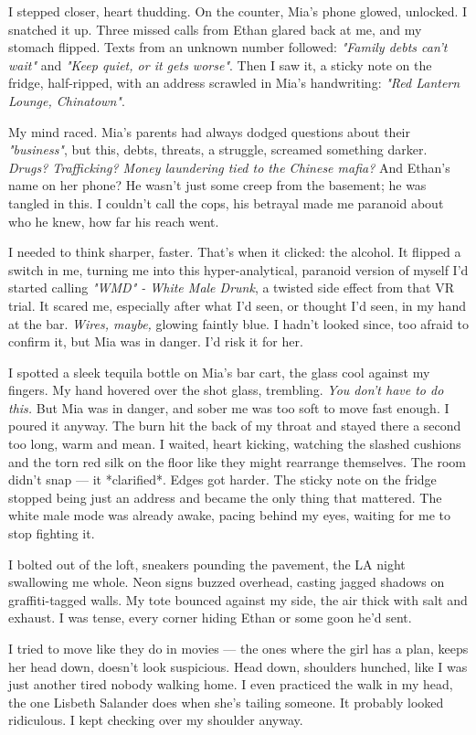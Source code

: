 \documentclass[12pt,oneside]{book}
\begin{document}
I stepped closer, heart thudding. On the counter, Mia’s phone glowed, unlocked. I snatched it up. Three missed calls from Ethan glared back at me, and my stomach flipped. Texts from an unknown number followed: \textit{"Family debts can’t wait"} and \textit{"Keep quiet, or it gets worse"}. Then I saw it, a sticky note on the fridge, half-ripped, with an address scrawled in Mia’s handwriting: \textit{"Red Lantern Lounge, Chinatown"}.

My mind raced. Mia’s parents had always dodged questions about their \textit{"business"}, but this, debts, threats, a struggle, screamed something darker. \textit{Drugs? Trafficking? Money laundering tied to the Chinese mafia?} And Ethan’s name on her phone? He wasn’t just some creep from the basement; he was tangled in this. I couldn’t call the cops, his betrayal made me paranoid about who he knew, how far his reach went.

I needed to think sharper, faster. That’s when it clicked: the alcohol. It flipped a switch in me, turning me into this hyper-analytical, paranoid version of myself I’d started calling \textit{"WMD" - White Male Drunk}, a twisted side effect from that VR trial. It scared me, especially after what I’d seen, or thought I’d seen, in my hand at the bar. \textit{Wires, maybe,} glowing faintly blue. I hadn’t looked since, too afraid to confirm it, but Mia was in danger. I’d risk it for her.

I spotted a sleek tequila bottle on Mia’s bar cart, the glass cool against my fingers. My hand hovered over the shot glass, trembling. \textit{You don’t have to do this.} But Mia was in danger, and sober me was too soft to move fast enough. I poured it anyway. The burn hit the back of my throat and stayed there a second too long, warm and mean. I waited, heart kicking, watching the slashed cushions and the torn red silk on the floor like they might rearrange themselves. The room didn’t snap — it *clarified*. Edges got harder. The sticky note on the fridge stopped being just an address and became the only thing that mattered. The white male mode was already awake, pacing behind my eyes, waiting for me to stop fighting it.

I bolted out of the loft, sneakers pounding the pavement, the LA night swallowing me whole. Neon signs buzzed overhead, casting jagged shadows on graffiti-tagged walls. My tote bounced against my side, the air thick with salt and exhaust. I was tense, every corner hiding Ethan or some goon he’d sent.

I tried to move like they do in movies — the ones where the girl has a plan, keeps her head down, doesn’t look suspicious. Head down, shoulders hunched, like I was just another tired nobody walking home. I even practiced the walk in my head, the one Lisbeth Salander does when she’s tailing someone. It probably looked ridiculous. I kept checking over my shoulder anyway.
\end{document}
